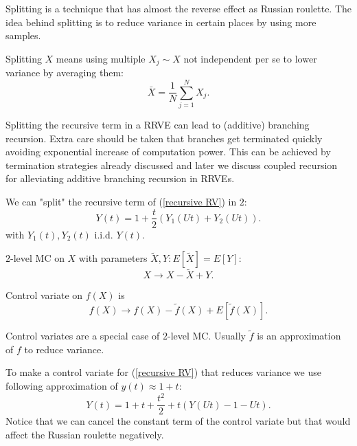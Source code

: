 \documentclass[a4paper,12pt]{article}
\begin{document}
Splitting is a technique that has almost the reverse effect as Russian roulette.
The idea behind splitting is to reduce variance in certain places by using more
samples.

\begin{definition}[splitting]
    Splitting $X$ means using multiple $X_{j} \sim X$ not independent per se to
    lower variance by averaging them:
    \[
        \bar{X}= \frac{1}{N} \sum_{j=1}^{N} X_{j}
        .\]
\end{definition}

Splitting the recursive term in a RRVE can lead to (additive) branching recursion.
Extra care should be taken that branches get terminated quickly avoiding exponential increase
of computation power. This can be
achieved by termination strategies already discussed and later we discuss coupled recursion for
alleviating additive branching recursion in RRVEs.

\begin{example}
    We can "split" the recursive term of  (\ref{recursive RV}) in $2$:
    \[
        Y(t) = 1 + \frac{t}{2}(Y_{1}(Ut)+Y_{2}(Ut))
        .\]
    with $Y_{1}(t),Y_{2}(t)$ i.i.d. $Y(t)$.
\end{example}

\vspace{0.2cm}

\begin{pythonn}
\end{pythonn}

\begin{definition}[$2$-level MC] \label{2 level}
    $2$-level MC on $X$ with parameters $\tilde{X}, Y: E[\tilde{X}]=E[Y]$:
    \[
        X \rightarrow X-\tilde{X} + Y
        .\]
\end{definition}

\begin{definition} \label{CV}
    Control variate on $f(X)$ is
    \[
        f(X) \rightarrow f(X)-\tilde{f}(X) + E[\tilde{f}(X)]
        .\]
\end{definition}
Control variates are a special case of $2$-level MC. Usually $\tilde{f}$ is an approximation
of $f$ to reduce variance.

\begin{example}
    To make a control variate for (\ref{recursive RV}) that reduces variance
    we use following approximation of $y(t) \approx 1+t$:
    \[
        Y(t)= 1+t+\frac{t^{2}}{2} + t(Y(Ut)-1-Ut)
        .\]
    Notice that we can cancel the constant term of the control variate
    but that would affect the Russian roulette negatively.
\end{example}
\end{document}
